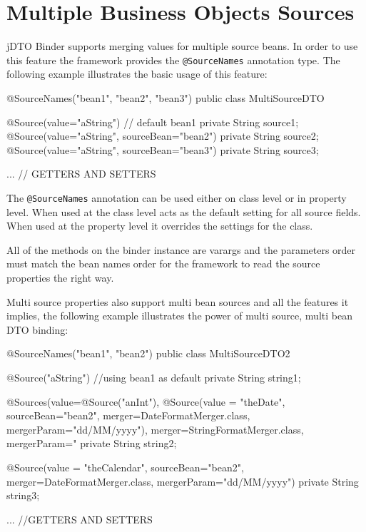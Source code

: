 \documentclass[11pt]{article}
\newcommand{\JDTO}{jDTO Binder\xspace}
\begin{document}
\section{Multiple Business Objects Sources}

\JDTO supports merging values for multiple source beans. In order to use this feature the framework provides the \texttt{@SourceNames} annotation type. The following example illustrates the basic usage of this feature:



\begin{java}
@SourceNames({"bean1", "bean2", "bean3"})
public class MultiSourceDTO {
    
    @Source(value="aString") // default bean1
    private String source1;
    @Source(value="aString", sourceBean="bean2")
    private String source2;
    @Source(value="aString", sourceBean="bean3")
    private String source3;
    
    ... // GETTERS AND SETTERS
}
\end{java}

The \texttt{@SourceNames} annotation can be used either on class level or in property level. When used at the class level acts as the default setting for all source fields. When used at the property level it overrides the settings for the class.

All of the methods on the binder instance are varargs and the parameters order must match the bean names order for the framework to read the source properties the right way.

Multi source properties also support multi bean sources and all the features it implies, the following example illustrates the power of multi source, multi bean DTO binding:


\begin{java}
@SourceNames({"bean1", "bean2"})
public class MultiSourceDTO2 {
    @Source("aString") //using bean1 as default
    private String string1;
    
    @Sources(value={@Source("anInt"), 
            @Source(value = "theDate", 
            sourceBean="bean2", 
            merger=DateFormatMerger.class, 
            mergerParam="dd/MM/yyyy")}, 
        merger=StringFormatMerger.class, mergerParam="%
    private String string2;
    
    @Source(value = "theCalendar", sourceBean="bean2", 
        merger=DateFormatMerger.class, mergerParam="dd/MM/yyyy")
    private String string3;

    ... //GETTERS AND SETTERS
}
\end{java}
\end{document}
